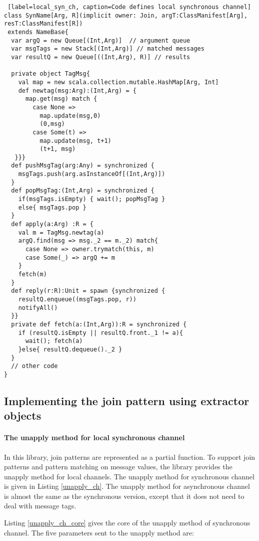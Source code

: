\begin{lstlisting} [label=local_syn_ch, caption=Code defines local synchronous channel]
class SynName[Arg, R](implicit owner: Join, argT:ClassManifest[Arg], resT:ClassManifest[R])
 extends NameBase{
  var argQ = new Queue[(Int,Arg)]  // argument queue
  var msgTags = new Stack[(Int,Arg)] // matched messages
  var resultQ = new Queue[((Int,Arg), R)] // results

  private object TagMsg{
    val map = new scala.collection.mutable.HashMap[Arg, Int]
    def newtag(msg:Arg):(Int,Arg) = {
      map.get(msg) match {
        case None =>
          map.update(msg,0)
          (0,msg)
        case Some(t) =>
          map.update(msg, t+1)
          (t+1, msg)
   }}}
  def pushMsgTag(arg:Any) = synchronized {  
    msgTags.push(arg.asInstanceOf[(Int,Arg)])
  }
  def popMsgTag:(Int,Arg) = synchronized {
    if(msgTags.isEmpty) { wait(); popMsgTag }
    else{ msgTags.pop }
  }
  def apply(a:Arg) :R = {
    val m = TagMsg.newtag(a)
    argQ.find(msg => msg._2 == m._2) match{
      case None => owner.trymatch(this, m)
      case Some(_) => argQ += m
    }
    fetch(m)
  }  
  def reply(r:R):Unit = spawn {synchronized {
    resultQ.enqueue((msgTags.pop, r))
    notifyAll()
  }}
  private def fetch(a:(Int,Arg)):R = synchronized {
    if (resultQ.isEmpty || resultQ.front._1 != a){
      wait(); fetch(a)
    }else{ resultQ.dequeue()._2 }
  }
  // other code
}
\end{lstlisting}




\subsection{Implementing the join pattern using extractor objects}

\paragraph{The unapply method for local synchronous channel}
In this library, join patterns are represented as a partial function.  To support join patterns and pattern matching on message values, the library provides the unapply method for local channels.  The unapply method for synchronous channel is given in Listing \ref{unapply_ch}.    The unapply method for asynchronous channel is almost the same as the synchronous version, except that it does not need to deal with message tags.

Listing \ref{unapply_ch_core} gives the core of the unapply method of synchronous channel.  The five parameters sent to the unapply method are:

